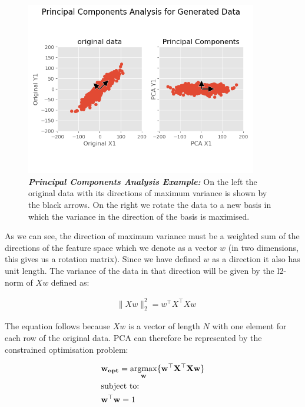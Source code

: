 \begin{figure}
    \centering
    \includegraphics[width=0.9\textwidth]{figures/background/PCA.png}
    \caption[Principal Components Analysis Example]{\textit{\textbf{Principal Components Analysis Example:}} On the left the original data with its directions of maximum variance is shown by the black arrows. On the right we rotate the data to a new basis in which the variance in the direction of the basis is maximised.}\label{fig:PCA}
\end{figure}

As we can see, the direction of maximum variance must be a weighted sum of the directions of the feature space which we denote as a vector $w$ (in two dimensions, this gives us a rotation matrix). Since we have defined $w$ as a direction it also has unit length. The variance of the data in that direction will be given by the l2-norm of $Xw$ defined as:

\begin{align}
     & \|Xw\|^2_2=w^{\top}X^{\top}Xw
\end{align}

The equation follows because $Xw$ is a vector of length $N$ with one element for each row of the original data. PCA can therefore be represented by the constrained optimisation problem:

\begin{align}
     & \mathbf{w_{opt}}=\underset{\mathbf{w}}{\mathrm{argmax}}\{\mathbf{w^{\top}X^{\top}}\mathbf{Xw}\} \\
     & \text{subject to:} \notag                                                                       \\
     & \mathbf{w^{\top}w}=1 \notag
\end{align}

